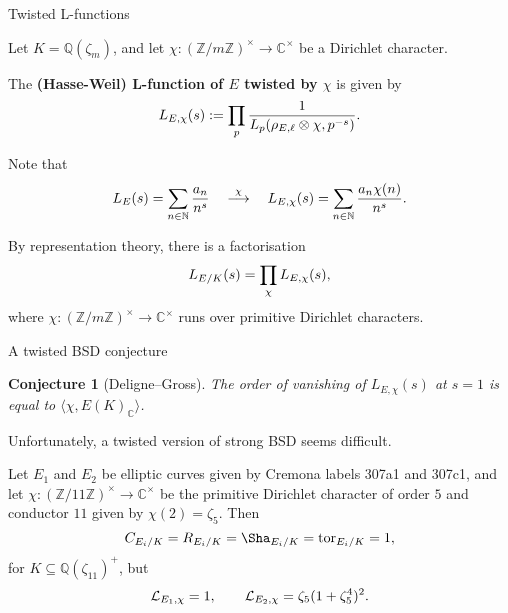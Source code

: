 \documentclass[10pt]{beamer}
\newtheorem{conjecture}{Conjecture}
\begin{document}
\begin{frame}[t]{Twisted L-functions}

Let $ K = \mathbb{Q}(\zeta_m) $, and let $ \chi : (\mathbb{Z} / m\mathbb{Z})^\times \to \mathbb{C}^\times $ be a Dirichlet character.

\pause

\vspace{0.5cm} The \textbf{(Hasse-Weil) L-function of $ E $ twisted by $ \chi $} is given by
\vspace{-0.2cm} $$ \vspace{-0.2cm} L_{E, \chi}(s) := \prod_p \dfrac{1}{L_p(\rho_{E, \ell} \otimes \chi, p^{-s})}. $$

\pause

Note that
\vspace{-0.2cm} $$ \vspace{-0.2cm} L_E(s) = \sum_{n \in \mathbb{N}} \dfrac{a_n}{n^s} \quad \overset{\chi}{\longrightarrow} \quad L_{E, \chi}(s) = \sum_{n \in \mathbb{N}} \dfrac{a_n\chi(n)}{n^s}. $$

\pause

\vspace{0.5cm} By representation theory, there is a factorisation
\vspace{-0.2cm} $$ \vspace{-0.2cm} L_{E / K}(s) = \prod_\chi L_{E, \chi}(s), $$
where $ \chi : (\mathbb{Z} / m\mathbb{Z})^\times \to \mathbb{C}^\times $ runs over primitive Dirichlet characters.

\end{frame}

\begin{frame}[t]{A twisted BSD conjecture}

\begin{conjecture}[Deligne--Gross]
The order of vanishing of $ L_{E, \chi}(s) $ at $ s = 1 $ is equal to $ \langle\chi, E(K)_\mathbb{C}\rangle $.
\end{conjecture}

\pause

\vspace{0.5cm} Unfortunately, a twisted version of strong BSD seems difficult.

\pause

\begin{example}
Let $ E_1 $ and $ E_2 $ be elliptic curves given by Cremona labels 307a1 and 307c1, and let $ \chi : (\mathbb{Z} / 11\mathbb{Z})^\times \to \mathbb{C}^\times $ be the primitive Dirichlet character of order $ 5 $ and conductor $ 11 $ given by $ \chi(2) = \zeta_5 $. \pause Then
\vspace{-0.2cm} $$ \vspace{-0.2cm} C_{E_i / K} = R_{E_i / K} = \Sha_{E_i / K} = \mathrm{tor}_{E_i / K} = 1, $$
for $ K \subseteq \mathbb{Q}(\zeta_{11})^+ $, \pause but
\vspace{-0.2cm} $$ \vspace{-0.2cm} \mathcal{L}_{E_1, \chi} = 1, \qquad \mathcal{L}_{E_2, \chi} = \zeta_5(1 + \zeta_5^4)^2. $$
\end{example}

\end{frame}
\end{document}
